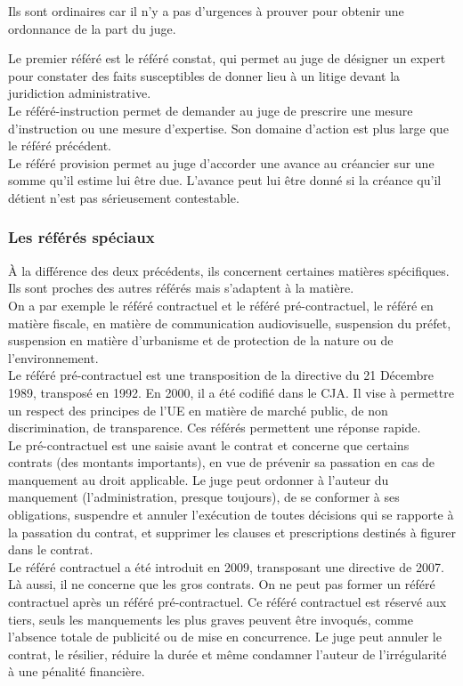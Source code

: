 \documentclass[10pt, a4paper, openany]{book}
\begin{document}
Ils sont ordinaires car il n'y a pas d'urgences à prouver pour obtenir une ordonnance de la part du juge. 


Le premier référé est le référé constat, qui permet au juge de désigner un expert pour constater des faits susceptibles de donner lieu à un litige devant la juridiction administrative. \\
Le référé-instruction permet de demander au juge de prescrire une mesure d'instruction ou une mesure d'expertise. Son domaine d'action est plus large que le référé précédent. \\
Le référé provision permet au juge d'accorder une avance au créancier sur une somme qu'il estime lui être due. L'avance peut lui être donné si la créance qu'il détient n'est pas sérieusement contestable. 

\subsubsection{Les référés spéciaux}

À la différence des deux précédents, ils concernent certaines matières spécifiques. Ils sont proches des autres référés mais s'adaptent à la matière. \\
On a par exemple le référé contractuel et le référé pré-contractuel, le référé en matière fiscale, en matière de communication audiovisuelle, suspension du préfet, suspension en matière d'urbanisme et de protection de la nature ou de l'environnement. \\
Le référé pré-contractuel est une transposition de la directive du 21 Décembre 1989, transposé en 1992. En 2000, il a été codifié dans le CJA. Il vise à permettre un respect des principes de l'UE en matière de marché public, de non discrimination, de transparence. Ces référés permettent une réponse rapide. \\
Le pré-contractuel est une saisie avant le contrat et concerne que certains contrats (des montants importants), en vue de prévenir sa passation en cas de manquement au droit applicable. Le juge peut ordonner à l'auteur du manquement (l'administration, presque toujours), de se conformer à ses obligations, suspendre et annuler l'exécution de toutes décisions qui se rapporte à la passation du contrat, et supprimer les clauses et prescriptions destinés à figurer dans le contrat. \\
Le référé contractuel a été introduit en 2009, transposant une directive de 2007. Là aussi, il ne concerne que les gros contrats. On ne peut pas former un référé contractuel après un référé pré-contractuel. Ce référé contractuel est réservé aux tiers, seuls les manquements les plus graves peuvent être invoqués, comme l'absence totale de publicité ou de mise en concurrence. Le juge peut annuler le contrat, le résilier, réduire la durée et même condamner l'auteur de l'irrégularité à une pénalité financière. 
\end{document}
